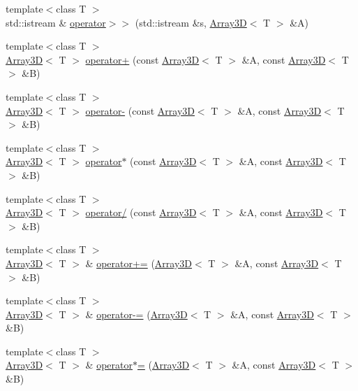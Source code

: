 \begin{DoxyCompactItemize}
{\footnotesize template$<$class T $>$ }\\std\-::istream \& \hyperlink{namespaceTNT_a6657bdc30991a0a8b4dbd2563f52397c}{operator$>$$>$} (std\-::istream \&s, \hyperlink{classTNT_1_1Array3D}{Array3\-D}$<$ T $>$ \&A)
\item 
{\footnotesize template$<$class T $>$ }\\\hyperlink{classTNT_1_1Array3D}{Array3\-D}$<$ T $>$ \hyperlink{namespaceTNT_a05f55a06994091a44d0c6ae743d9c0fc}{operator+} (const \hyperlink{classTNT_1_1Array3D}{Array3\-D}$<$ T $>$ \&A, const \hyperlink{classTNT_1_1Array3D}{Array3\-D}$<$ T $>$ \&B)
\item 
{\footnotesize template$<$class T $>$ }\\\hyperlink{classTNT_1_1Array3D}{Array3\-D}$<$ T $>$ \hyperlink{namespaceTNT_a322eb831bd13a3a44822b1351d6f601e}{operator-\/} (const \hyperlink{classTNT_1_1Array3D}{Array3\-D}$<$ T $>$ \&A, const \hyperlink{classTNT_1_1Array3D}{Array3\-D}$<$ T $>$ \&B)
\item 
{\footnotesize template$<$class T $>$ }\\\hyperlink{classTNT_1_1Array3D}{Array3\-D}$<$ T $>$ \hyperlink{namespaceTNT_acee7fc2b1dccb1c2525cfb286a47e2ed}{operator$\ast$} (const \hyperlink{classTNT_1_1Array3D}{Array3\-D}$<$ T $>$ \&A, const \hyperlink{classTNT_1_1Array3D}{Array3\-D}$<$ T $>$ \&B)
\item 
{\footnotesize template$<$class T $>$ }\\\hyperlink{classTNT_1_1Array3D}{Array3\-D}$<$ T $>$ \hyperlink{namespaceTNT_a2252a78369b90a4852da38ce2d8a732b}{operator/} (const \hyperlink{classTNT_1_1Array3D}{Array3\-D}$<$ T $>$ \&A, const \hyperlink{classTNT_1_1Array3D}{Array3\-D}$<$ T $>$ \&B)
\item 
{\footnotesize template$<$class T $>$ }\\\hyperlink{classTNT_1_1Array3D}{Array3\-D}$<$ T $>$ \& \hyperlink{namespaceTNT_abd844f41c5e4dd936c99b5a7d35e5af0}{operator+=} (\hyperlink{classTNT_1_1Array3D}{Array3\-D}$<$ T $>$ \&A, const \hyperlink{classTNT_1_1Array3D}{Array3\-D}$<$ T $>$ \&B)
\item 
{\footnotesize template$<$class T $>$ }\\\hyperlink{classTNT_1_1Array3D}{Array3\-D}$<$ T $>$ \& \hyperlink{namespaceTNT_a059e5ad1d2ce6b2c4d96f9cf87c68a04}{operator-\/=} (\hyperlink{classTNT_1_1Array3D}{Array3\-D}$<$ T $>$ \&A, const \hyperlink{classTNT_1_1Array3D}{Array3\-D}$<$ T $>$ \&B)
\item 
{\footnotesize template$<$class T $>$ }\\\hyperlink{classTNT_1_1Array3D}{Array3\-D}$<$ T $>$ \& \hyperlink{namespaceTNT_a537d33bfd218ca51057f36162d042ada}{operator$\ast$=} (\hyperlink{classTNT_1_1Array3D}{Array3\-D}$<$ T $>$ \&A, const \hyperlink{classTNT_1_1Array3D}{Array3\-D}$<$ T $>$ \&B)

\end{DoxyCompactItemize}
